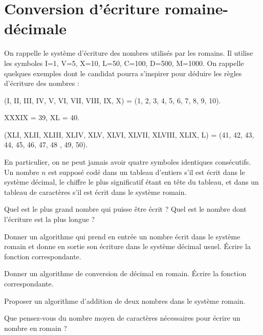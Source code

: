 \renewcommand{\SourceFile}{7-arithmetique-et-calculs-numeriques/src/7-2.ml}

\section{Conversion d'écriture romaine-décimale}

On rappelle le système d'écriture des nombres utilisés par les romains. Il utilise les symboles I=1, V=5, X=10, L=50, C=100, D=500, M=1000. On rappelle quelques exemples dont le candidat pourra s'inspirer pour déduire les règles d'écriture des nombres :
\medskip

(I, II, III, IV, V, VI, VII, VIII, IX, X) = (1, 2, 3, 4, 5, 6, 7, 8, 9, 10).
\medskip

XXXIX = 39, XL = 40.
\medskip

(XLI, XLII, XLIII, XLIV, XLV, XLVI, XLVII, XLVIII, XLIX, L) = (41, 42, 43, 44, 45, 46, 47, 48 , 49, 50).
\medskip

En particulier, on ne peut jamais avoir quatre symboles identiques consécutifs. Un nombre $n$ est supposé codé dans un tableau d'entiers s'il est écrit dans le système décimal, le chiffre le plus significatif étant en tête du tableau, et dans un tableau de caractères s'il est écrit dans le système romain.

\Q
Quel est le plus grand nombre qui puisse être écrit ? Quel est le nombre dont l'écriture est la plus longue ?

\Q
Donner un algorithme qui prend en entrée un nombre écrit dans le système romain et donne en sortie son écriture dans le système décimal usuel. Écrire la fonction correspondante.

\Q
Donner un algorithme de conversion de décimal en romain. Écrire la fonction correspondante.

\Q
Proposer un algorithme d'addition de deux nombres dans le système romain.

\Q
Que pensez-vous du nombre moyen de caractères nécessaires pour écrire un nombre en romain ?

\Corrige

\Q
